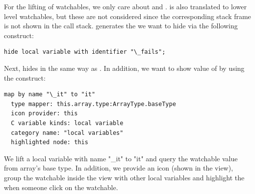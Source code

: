  For the lifting of watchables, we only care about
 and .  is also
translated to lower level watchables, but these are not considered since the
corresponding stack frame is not shown in the call stack. 
generates the   we want to hide via the following
 construct:

\begin{lstlisting}[frame=single,language=mbeddr]
hide local variable with identifier "\_fails";
\end{lstlisting}

Next,  hides   in the same
way as . In addition, we want to show value of  by using the
 construct:

\begin{lstlisting}[frame=single,language=mbeddr]
map by name "\_it" to "it" 
  type mapper: this.array.type:ArrayType.baseType 
  icon provider: this 
  C variable kinds: local variable 
  category name: "local variables" 
  highlighted node: this
\end{lstlisting}

We lift a local variable with name "\_it" to "it" and query the
watchable value from  array's base type. In addition, we provide an icon (shown
in the view), group the watchable inside the view with other local variables
and highlight the  when someone click on the
watchable.
